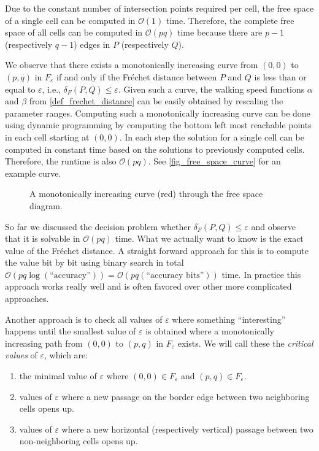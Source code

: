 \documentclass[
oneside,
fontsize=11pt
]{scrartcl}
\begin{document}
Due to the constant number of intersection points required per cell, 
the free space of a single cell can be computed in $\mathcal{O}(1)$ time.
Therefore, the complete free space of all cells can be computed in $\mathcal{O}(pq)$ time
because there are $p-1$ (respectively $q-1$) edges in $P$ (respectively $Q$).

We observe that there exists 
a monotonically increasing curve from $(0,0)$ to $(p,q)$ in $F_\varepsilon$
if and only if the Fréchet distance between $P$ and $Q$ is less than or equal to $\varepsilon$,
i.e., $\delta_F(P,Q) \leq \varepsilon$.
Given such a curve, the walking speed functions $\alpha$ and $\beta$ from \autoref{def_frechet_distance}
can be easily obtained by rescaling the parameter ranges. 
Computing such a monotonically increasing curve can be done using dynamic programming 
by computing the bottom left most reachable points in each cell starting at $(0,0)$. 
In each step the solution for a single cell can be computed in constant time based on the 
solutions to previously computed cells. 
Therefore, the runtime is also $\mathcal{O}(pq)$. 
See \autoref{fig_free_space_curve} for an example curve. \cite{alt_computing_1995}

\begin{figure}[ht]
  \centering
  \resizebox{0.5\textwidth}{!}{
    
  }
  \caption{A monotonically increasing curve (red) through the free space diagram.}
  \label{fig_free_space_curve}
\end{figure}

So far we discussed the decision problem whether $\delta_{F}(P,Q) \leq \varepsilon$
and observe that it is solvable in $\mathcal{O}(pq)$ time.
What we actually want to know is the exact value of the Fréchet distance.
A straight forward approach for this is to compute the value bit by bit 
using binary search in total $\mathcal{O}(pq \log (\text{``accuracy''})) = \mathcal{O}(pq  (\text{``accuracy bits''}))$ time.
In practice this approach works really well 
and is often favored over other more complicated approaches. \cite{alt_computing_1995} 

Another approach is to check all values of $\varepsilon$ where something ``interesting'' happens
until the smallest value of $\varepsilon$ is obtained where a monotonically increasing path 
from $(0,0)$ to $(p,q)$ in $F_\varepsilon$ exists.
We will call these the \textit{critical values} of $\varepsilon$, which are:
\begin{enumerate}
  \item the minimal value of $\varepsilon$ where $(0,0) \in F_\varepsilon$ and $(p,q) \in F_\varepsilon$.
  \item values of $\varepsilon$ where a new passage on the border edge 
        between two neighboring cells opens up.
  \item values of $\varepsilon$ where a new horizontal (respectively vertical) passage 
        between two non-neighboring cells opens up.
\end{enumerate}
\end{document}
